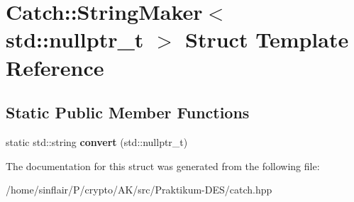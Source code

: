 \hypertarget{structCatch_1_1StringMaker_3_01std_1_1nullptr__t_01_4}{}\section{Catch\+:\+:String\+Maker$<$ std\+:\+:nullptr\+\_\+t $>$ Struct Template Reference}
\label{structCatch_1_1StringMaker_3_01std_1_1nullptr__t_01_4}
\subsection*{Static Public Member Functions}
\begin{DoxyCompactItemize}
\item 
\mbox{\label{structCatch_1_1StringMaker_3_01std_1_1nullptr__t_01_4_a131fbb1f5cd68c93aaf30d34e3519e9c}} 
static std\+::string {\bfseries convert} (std\+::nullptr\+\_\+t)
\end{DoxyCompactItemize}


The documentation for this struct was generated from the following file\+:\begin{DoxyCompactItemize}
\item 
/home/sinflair/\+P/crypto/\+A\+K/src/\+Praktikum-\/\+D\+E\+S/catch.\+hpp\end{DoxyCompactItemize}
